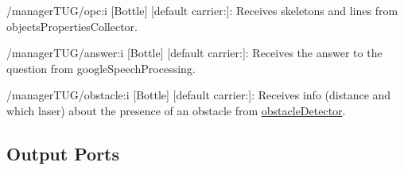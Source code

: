 \begin{DoxyItemize}
\item /manager\+T\+U\+G/opc\+:i \mbox{[}Bottle\mbox{]} \mbox{[}default carrier\+:\mbox{]}\+: Receives skeletons and lines from objects\+Properties\+Collector.
\item /manager\+T\+U\+G/answer\+:i \mbox{[}Bottle\mbox{]} \mbox{[}default carrier\+:\mbox{]}\+: Receives the answer to the question from google\+Speech\+Processing.
\item /manager\+T\+U\+G/obstacle\+:i \mbox{[}Bottle\mbox{]} \mbox{[}default carrier\+:\mbox{]}\+: Receives info (distance and which laser) about the presence of an obstacle from \hyperlink{group__obstacleDetector}{obstacle\+Detector}.
\end{DoxyItemize}\hypertarget{group__skeletonViewer_outputports_sec}{}\subsection{Output Ports}\label{group__skeletonViewer_outputports_sec}

